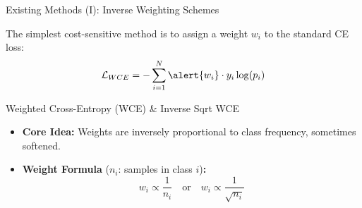 \documentclass[aspectratio=169]{beamer}
\begin{document}
\begin{frame}{Existing Methods (I): Inverse Weighting Schemes}

\vspace{0.03\textwidth}
The simplest cost-sensitive method is to assign a weight $w_i$ to the standard CE loss:
$$ \mathcal{L}_{WCE} = - \sum_{i=1}^{N} \alert{w_i} \cdot y_i \log(p_i) $$


\begin{block}{Weighted Cross-Entropy (WCE) \& Inverse Sqrt WCE}
    \begin{itemize}
        \item \textbf{Core Idea:} Weights are inversely proportional to class frequency, sometimes softened.
        \item \textbf{Weight Formula} ($n_i$: samples in class $i$)\textbf{:}
              $$ w_i \propto \frac{1}{n_i} \quad \text{or} \quad w_i \propto \frac{1}{\sqrt{n_i}} $$
    \end{itemize}
\end{block}

\end{frame}
\end{document}
